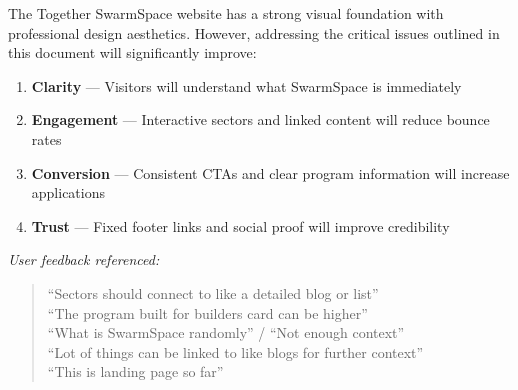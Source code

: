\documentclass[12pt,a4paper]{article}
\begin{document}
The Together SwarmSpace website has a strong visual foundation with professional design aesthetics. However, addressing the critical issues outlined in this document will significantly improve:

\begin{enumerate}
    \item \textbf{Clarity} --- Visitors will understand what SwarmSpace is immediately
    \item \textbf{Engagement} --- Interactive sectors and linked content will reduce bounce rates
    \item \textbf{Conversion} --- Consistent CTAs and clear program information will increase applications
    \item \textbf{Trust} --- Fixed footer links and social proof will improve credibility
\end{enumerate}

\vspace{1cm}

\noindent\textit{User feedback referenced:}
\begin{quote}
``Sectors should connect to like a detailed blog or list''\\
``The program built for builders card can be higher''\\
``What is SwarmSpace randomly'' / ``Not enough context''\\
``Lot of things can be linked to like blogs for further context''\\
``This is landing page so far''
\end{quote}
\end{document}
